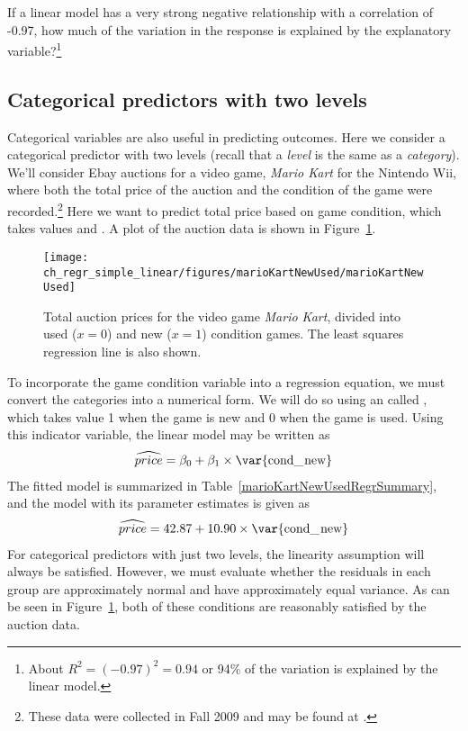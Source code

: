 \begin{exercise}
If a linear model has a very strong negative relationship with a correlation of -0.97, how much of the variation in the response is explained by the explanatory variable?\footnote{About $R^2 = (-0.97)^2 = 0.94$ or 94\% of the variation is explained by the linear model.}
\end{exercise}



\subsection{Categorical predictors with two levels}
\label{categoricalPredictorsWithTwoLevels}

Categorical variables are also useful in predicting outcomes. Here we consider a categorical predictor with two levels (recall that a \emph{level} is the same as a \emph{category}). We'll consider Ebay auctions for a video game, \emph{Mario Kart} for the Nintendo Wii, where both the total price of the auction and the condition of the game were recorded.\footnote{These data were collected in Fall 2009 and may be found at .} Here we want to predict total price based on game condition, which takes values  and . A plot of the auction data is shown in Figure~\ref{marioKartNewUsed}.

\begin{figure}[h]
\centering
\texttt{[image: ch\_regr\_simple\_linear/figures/marioKartNewUsed/marioKartNewUsed]}
\caption{Total auction prices for the video game \emph{Mario Kart}, divided into used ($x=0$) and new ($x=1$) condition games. The least squares regression line is also shown.}
\label{marioKartNewUsed}
\end{figure}

To incorporate the game condition variable into a regression equation, we must convert the categories into a numerical form. We will do so using an  called , which takes value 1 when the game is new and 0 when the game is used. Using this indicator variable, the linear model may be written as
\begin{align*}
\widehat{price} = \beta_0 + \beta_1 \times \text{\var{cond\_\hspace{0.3mm}new}}
\end{align*}
The fitted model is summarized in Table~\ref{marioKartNewUsedRegrSummary}, and the model with its parameter estimates is given as
\begin{align*}
\widehat{price} = 42.87 + 10.90 \times \text{\var{cond\_\hspace{0.3mm}new}}
\end{align*}
For categorical predictors with just two levels, the linearity assumption will always be satisfied. However, we must evaluate whether the residuals in each group are approximately normal and have approximately equal variance. As can be seen in Figure~\ref{marioKartNewUsed}, both of these conditions are reasonably satisfied by the auction data.


